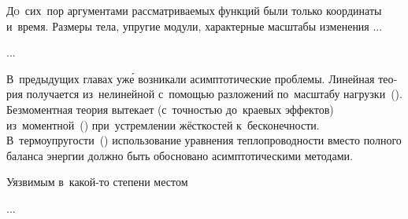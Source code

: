 

\thispagestyle{empty}

\label{chapter:asymptoticmethods}

\begin{otherlanguage}{russian}



\lettrine[lines=2, findent=2pt, nindent=0pt]{Д}{о}~сих~пор аргументами рассматриваемых функций были только координаты и~время. Размеры тела, упругие модули, характерные масштабы изменения ...

...


В~предыдущих главах уж\'{е} возникали асимптотические проблемы. Линейная теория получается из~нелинейной с~помощью разложений по~масштабу нагрузки~(). Безмоментная теория вытекает (с~точностью до~краевых эффектов) из~моментной~() при~устремлении  жёсткостей к~бесконечности. В~термо\-упругости~() использование уравнения теплопроводности вместо полного баланса энергии должно быть обосновано асимпто\-ти\-чес\-кими методами.

Уязвимым в~какой\hbox{-}то степени местом


...





\end{otherlanguage}
